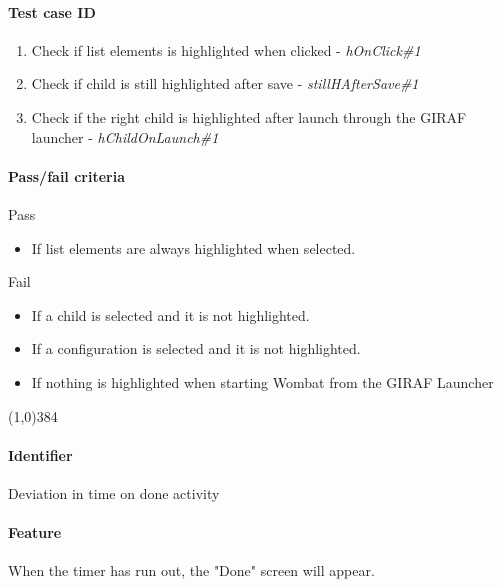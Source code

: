 \paragraph{Test case ID}
	\begin{enumerate}
		\item Check if list elements is highlighted when clicked - \textit{hOnClick\#1}
		\item Check if child is still highlighted after save - \textit{stillHAfterSave\#1}
		\item Check if the right child is highlighted after launch through the GIRAF launcher - \textit{hChildOnLaunch\#1}
	\end{enumerate}
\paragraph{Pass/fail criteria}
	Pass
	\begin{itemize}
		\item If list elements are always highlighted when selected.
	\end{itemize}
	Fail
	\begin{itemize}
		\item If a child is selected and it is not highlighted.
		\item If a configuration is selected and it is not highlighted.
		\item If nothing is highlighted when starting Wombat from the GIRAF Launcher
	\end{itemize}


\begin{center}
	\line(1,0){384}
\end{center}
\paragraph{Identifier}
	Deviation in time on done activity
\paragraph{Feature}
	When the timer has run out, the "Done" screen will appear. 

